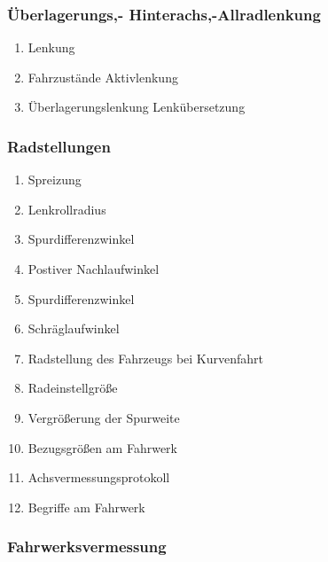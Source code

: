 \subsubsection{Überlagerungs,-
Hinterachs,-Allradlenkung}\label{ueberlagerungs--hinterachs-allradlenkung}

\begin{enumerate}
\item
  Lenkung\\
\item
  Fahrzustände Aktivlenkung\\
\item
  Überlagerungslenkung Lenkübersetzung
\end{enumerate}

\subsubsection{Radstellungen}\label{radstellungen}

\begin{enumerate}
\item
  Spreizung\\
\item
  Lenkrollradius\\
\item
  Spurdifferenzwinkel\\
\item
  Postiver Nachlaufwinkel\\
\item
  Spurdifferenzwinkel\\
\item
  Schräglaufwinkel\\
\item
  Radstellung des Fahrzeugs bei Kurvenfahrt\\
\item
  Radeinstellgröße\\
\item
  Vergrößerung der Spurweite\\
\item
  Bezugsgrößen am Fahrwerk\\
\item
  Achsvermessungsprotokoll\\
\item
  Begriffe am Fahrwerk
\end{enumerate}

\subsubsection{Fahrwerksvermessung}\label{fahrwerksvermessung}


